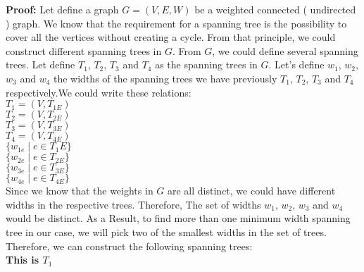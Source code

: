 \documentclass[12]{article}
\begin{document}

\textbf{Proof:}
Let define a graph $G = (V, E, W)$ be a weighted connected ( undirected ) graph. We know that the requirement for a spanning tree is the possibility to cover all the vertices without creating a cycle. From that principle, we could construct different spanning trees in $G$. From $G$, we could define several spanning trees. Let define $T_1$, $T_2$, $T_3$ and $T_4$ as the spanning  trees in $G$.  Let's define $w_1$, $w_2$, $w_3$ and $w_4$ the widths of the spanning trees we have previously  $T_1$, $T_2$, $T_3$ and $T_4$ respectively.We could write these relations:  \\
$T_1 = (V, T_{1E})$ \\
$T_2 = (V, T_{2E})$ \\
$T_3 = (V, T_{3E})$ \\
$T_4 = (V, T_{4E})$ \\
$\lbrace  w_{1e} \mid e\in T{_1E} \rbrace$ \\
$\lbrace  w_{2e} \mid e\in T_{2E} \rbrace$\\
$\lbrace  w_{3e} \mid e\in T_{3E} \rbrace$\\
$\lbrace  w_{4e} \mid e\in T_{4E} \rbrace$\\

Since we know that the weights in $G$ are all distinct, we could have different widths in the respective trees. Therefore, The set of widths $w_1$, $w_2$, $w_3$  and $w_4$ would be distinct. As a Result, to find more than one minimum width spanning tree in our case, we will pick two of the smallest widths in the set of trees. Therefore, we can construct the following spanning trees: \\

\textbf{ This is $T_1$}\\

\begin{center}
\end{center}
\end{document}
